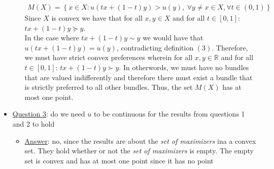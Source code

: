 \documentclass{article}
\begin{document}
\begin{itemize}
\begin{itemize}
    \begin{gather*}
      M(X) = \left\{x \in X: u(tx + (1-t)y) > u(y) ,\ \forall y \neq x \in X, \forall t \in (0,1) \right\} \ \tag{3}
    \end{gather*}
    Since $X$ is convex we have that for all $x, y \in X$ and for all $t \in [0,1]$: $tx + (1-t)y \succeq y$. \\
    In the case where $tx + (1-t)y \sim y$ we would have that $u(tx + (1-t)y) = u(y)$, contradicting definition $(3)$. Therefore, we must have strict convex preferences wherein for all $x, y \in \mathbb{R}$ and for all $t \in [0,1]$: $tx + (1-t)y \succ y$. In otherwords, we must have no bundles that are valued indifferently and therefore there must exist a bundle that is strictly preferred to all other bundles. Thus, the set $M(X)$ has at most one point.
  \end{itemize}
  \item  \underline{Question 3}: do we need $u$ to be continuous for the results from questions 1 and 2 to hold
  \begin{itemize}
    \item  \underline{Answer}: no, since the results are about the \textit{set of maximizers} ina a convex set. They hold whether or not the \textit{set of maximizers} is empty. The empty set is convex and has at most one point since it has no point
  \end{itemize}
\end{itemize}
\par
\vspace{6mm}
\end{document}
